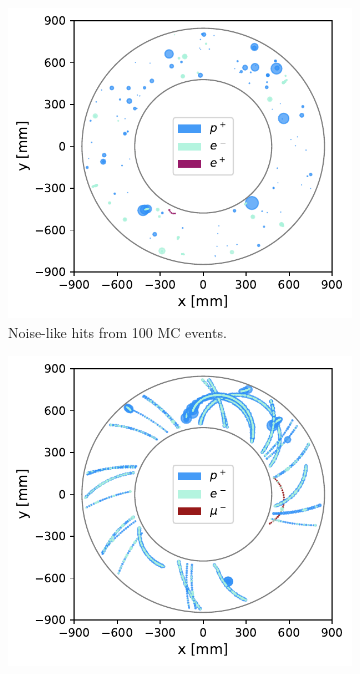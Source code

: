 \begin{figure}
    \centering
    \captionsetup[subfigure]{justification=centering}
    \begin{subfigure}[t]{0.45\textwidth}
        \centering
        \hspace{-1cm} %
        \includegraphics[width=\textwidth]{chapter4/only_noiselike_events.pdf}
        \caption{Noise-like hits from 100 MC events.}
        \label{fig:cdc_rconst_vs_noise:low}
    \end{subfigure}
    \begin{subfigure}[t]{0.45\textwidth}
        \centering
        \hspace{-1cm} %
        \includegraphics[width=\textwidth]{chapter4/only_reconstructible_events.pdf}

\end{subfigure}
\end{figure}
